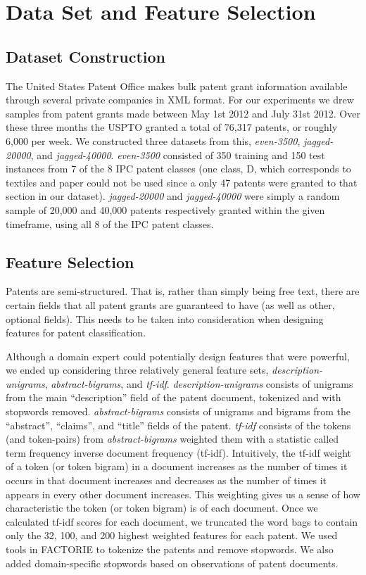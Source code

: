 \section{Data Set and Feature Selection}

\subsection{Dataset Construction}
\indent
The United States Patent Office makes bulk patent grant information available through several private companies\cite{USPTO:2013:patent-catalog} in XML format\cite{USPTO:2013:dtd}. For our experiments we drew samples from patent grants made between May 1st 2012 and July 31st 2012. Over these three months the USPTO granted a total of 76,317 patents, or roughly 6,000 per week. We constructed three datasets from this, \emph{even-3500}, \emph{jagged-20000}, and \emph{jagged-40000}. \emph{even-3500} consisted of 350 training and 150 test instances from 7 of the 8 IPC patent classes (one class, D, which corresponds to textiles and paper could not be used since a only 47 patents were granted to that section in our dataset). \emph{jagged-20000} and \emph{jagged-40000} were simply a random sample of 20,000 and 40,000 patents respectively granted within the given timeframe, using all 8 of the IPC patent classes.

\subsection{Feature Selection}
\indent
Patents are semi-structured. That is, rather than simply being free text, there are certain fields that all patent grants are guaranteed to have (as well as other, optional fields). This needs to be taken into consideration when designing features for patent classification. 

Although a domain expert could potentially design features that were powerful, we ended up considering three relatively general feature sets, \emph{description-unigrams}, \emph{abstract-bigrams}, and \emph{tf-idf}. \emph{description-unigrams} consists of unigrams from the main ``description'' field of the patent document, tokenized and with stopwords removed. \emph{abstract-bigrams} consists of unigrams and bigrams from the ``abstract'', ``claims'', and ``title'' fields of the patent. \emph{tf-idf} consists of the tokens (and token-pairs) from \emph{abstract-bigrams} weighted them with a statistic called term frequency inverse document frequency (tf-idf)\cite{manning:2008:IR}. Intuitively, the tf-idf weight of a token (or token bigram) in a document increases as the number of times it occurs in that document increases and decreases as the number of times it appears in every other document increases. This weighting gives us a sense of how characteristic the token (or token bigram) is of each document. Once we calculated tf-idf scores for each document, we truncated the word bags to contain only the 32, 100, and 200 highest weighted features for each patent. We used tools in FACTORIE\cite{mccallum09:factorie:} to tokenize the patents and remove stopwords. We also added domain-specific stopwords based on observations of patent documents. 


